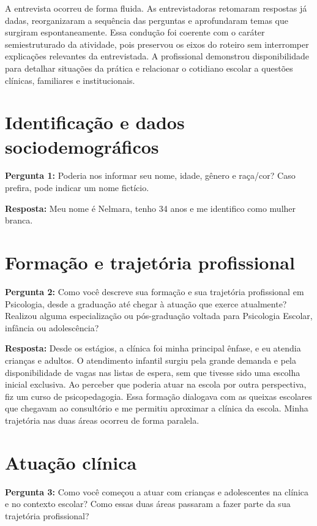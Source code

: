 \documentclass[12pt,a4paper,oneside]{abntex2}
\begin{document}
A entrevista ocorreu de forma fluida. As entrevistadoras retomaram respostas já dadas, reorganizaram a sequência das perguntas e aprofundaram temas que surgiram espontaneamente. Essa condução foi coerente com o caráter semiestruturado da atividade, pois preservou os eixos do roteiro sem interromper explicações relevantes da entrevistada. A profissional demonstrou disponibilidade para detalhar situações da prática e relacionar o cotidiano escolar a questões clínicas, familiares e institucionais.

\section{Identificação e dados sociodemográficos}

\noindent\textbf{Pergunta 1:} Poderia nos informar seu nome, idade, gênero e raça/cor? Caso prefira, pode indicar um nome fictício.

\noindent\textbf{Resposta:} Meu nome é Nelmara, tenho 34 anos e me identifico como mulher branca.

\section{Formação e trajetória profissional}

\noindent\textbf{Pergunta 2:} Como você descreve sua formação e sua trajetória profissional em Psicologia, desde a graduação até chegar à atuação que exerce atualmente? Realizou alguma especialização ou pós-graduação voltada para Psicologia Escolar, infância ou adolescência?

\noindent\textbf{Resposta:} Desde os estágios, a clínica foi minha principal ênfase, e eu atendia crianças e adultos. O atendimento infantil surgiu pela grande demanda e pela disponibilidade de vagas nas listas de espera, sem que tivesse sido uma escolha inicial exclusiva. Ao perceber que poderia atuar na escola por outra perspectiva, fiz um curso de psicopedagogia. Essa formação dialogava com as queixas escolares que chegavam ao consultório e me permitiu aproximar a clínica da escola. Minha trajetória nas duas áreas ocorreu de forma paralela.

\section{Atuação clínica}

\noindent\textbf{Pergunta 3:} Como você começou a atuar com crianças e adolescentes na clínica e no contexto escolar? Como essas duas áreas passaram a fazer parte da sua trajetória profissional?
\end{document}
